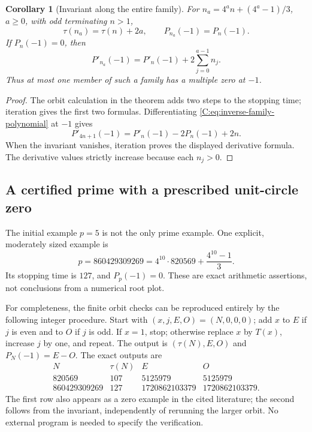 \documentclass[11pt,a4paper]{article}
\newtheorem{corollary}[theorem]{Corollary}
\theoremstyle{definition}
\theoremstyle{remark}
\numberwithin{equation}{section}
\begin{document}
\begin{corollary}[Invariant along the entire family]
For $n_a=4^a n+(4^a-1)/3$, $a\geq0$, with odd terminating $n>1$,
\[
 \tau(n_a)=\tau(n)+2a,\qquad P_{n_a}(-1)=P_n(-1).
\]
If $P_n(-1)=0$, then
\[
 P'_{n_a}(-1)=P'_n(-1)+2\sum_{j=0}^{a-1}n_j.
\]
Thus at most one member of such a family has a multiple zero at $-1$.
\end{corollary}

\begin{proof}
The orbit calculation in the theorem adds two steps to the stopping time;
iteration gives the first two formulas. Differentiating
\eqref{C:eq:inverse-family-polynomial} at $-1$ gives
\[
 P'_{4n+1}(-1)=P'_n(-1)-2P_n(-1)+2n.
\]
When the invariant vanishes, iteration proves the displayed derivative
formula. The derivative values strictly increase because each $n_j>0$.
\end{proof}

\subsection{A certified prime with a prescribed unit-circle zero}

The initial example $p=5$ is not the only prime example. One explicit,
moderately sized example is
\begin{equation}
\label{C:eq:large-prime-minus-one}
 p=860429309269
   =4^{10}\cdot820569+\frac{4^{10}-1}{3}.
\end{equation}
Its stopping time is $127$, and $P_p(-1)=0$. These are exact arithmetic
assertions, not conclusions from a numerical root plot.

For completeness, the finite orbit checks can be reproduced entirely by
the following integer procedure. Start with $(x,j,E,O)=(N,0,0,0)$;
add $x$ to $E$ if $j$ is even and to $O$ if $j$ is odd. If $x=1$, stop;
otherwise replace $x$ by $T(x)$, increase $j$ by one, and repeat.
The output is $(\tau(N),E,O)$ and $P_N(-1)=E-O$.
The exact outputs are
\[
\begin{array}{r|r|r|r}
N&\tau(N)&E&O\\\hline
820569&107&5125979&5125979\\
860429309269&127&1720862103379&1720862103379.
\end{array}
\]
The first row also appears as a zero example in the cited literature;
the second follows from the invariant, independently of rerunning the
larger orbit. No external program is needed to specify the verification.
\end{document}
